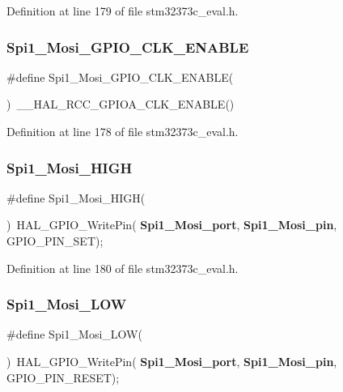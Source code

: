 Definition at line 179 of file stm32373c\+\_\+eval.\+h.

\mbox{\label{group___l_e_d_gaf8c0394528e46c40f718c07c51bfab61}} 
\subsubsection{Spi1\+\_\+\+Mosi\+\_\+\+G\+P\+I\+O\+\_\+\+C\+L\+K\+\_\+\+E\+N\+A\+B\+LE}
{\footnotesize\ttfamily \#define Spi1\+\_\+\+Mosi\+\_\+\+G\+P\+I\+O\+\_\+\+C\+L\+K\+\_\+\+E\+N\+A\+B\+LE(\begin{DoxyParamCaption}{ }\end{DoxyParamCaption})~\+\_\+\+\_\+\+H\+A\+L\+\_\+\+R\+C\+C\+\_\+\+G\+P\+I\+O\+A\+\_\+\+C\+L\+K\+\_\+\+E\+N\+A\+B\+LE()}



Definition at line 178 of file stm32373c\+\_\+eval.\+h.

\mbox{\label{group___l_e_d_ga852797cf10e7e68de177c728fc6b8e99}} 
\subsubsection{Spi1\+\_\+\+Mosi\+\_\+\+H\+I\+GH}
{\footnotesize\ttfamily \#define Spi1\+\_\+\+Mosi\+\_\+\+H\+I\+GH(\begin{DoxyParamCaption}{ }\end{DoxyParamCaption})~H\+A\+L\+\_\+\+G\+P\+I\+O\+\_\+\+Write\+Pin(\textbf{ Spi1\+\_\+\+Mosi\+\_\+port},\textbf{ Spi1\+\_\+\+Mosi\+\_\+pin}, G\+P\+I\+O\+\_\+\+P\+I\+N\+\_\+\+S\+ET);}



Definition at line 180 of file stm32373c\+\_\+eval.\+h.

\mbox{\label{group___l_e_d_ga3224bc32b453273c131fe80db161822c}} 
\subsubsection{Spi1\+\_\+\+Mosi\+\_\+\+L\+OW}
{\footnotesize\ttfamily \#define Spi1\+\_\+\+Mosi\+\_\+\+L\+OW(\begin{DoxyParamCaption}{ }\end{DoxyParamCaption})~H\+A\+L\+\_\+\+G\+P\+I\+O\+\_\+\+Write\+Pin(\textbf{ Spi1\+\_\+\+Mosi\+\_\+port},\textbf{ Spi1\+\_\+\+Mosi\+\_\+pin}, G\+P\+I\+O\+\_\+\+P\+I\+N\+\_\+\+R\+E\+S\+ET);}



